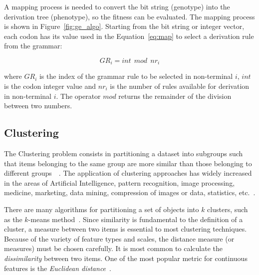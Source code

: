 \documentclass[conference,compsoc]{IEEEtran}
\begin{document}
A mapping process is needed to convert the bit string (genotype) into the derivation tree (phenotype), so the fitness can be evaluated. The mapping process is shown in Figure~\ref{fig:ge_algo}. Starting from the bit string or integer vector, each codon has its value used in the Equation~\ref{eq:map} to select a derivation rule from the grammar:


\begin{equation}\label{eq:map}
GR_i = int~~mod~~nr_i
\end{equation}


where $GR_i$ is the index of the grammar rule to be selected in non-terminal $i$, $int$ is the codon integer value and $nr_i$ is the number of rules available for derivation in non-terminal $i$. The operator $mod$ returns the remainder of the division between two numbers.


\subsection{Clustering}


The Clustering problem consists in partitioning a dataset into subgroups such that items belonging to the same group are more similar than those belonging to different groups~\cite{boric2007genetic}~\cite{ahalya2015data}. The application of clustering approaches has widely increased in the areas of Artificial Intelligence, pattern recognition, image processing, medicine, marketing, data mining, compression of images or data, statistics, etc.~\cite{ahalya2015data}.






There are many algorithms for partitioning a set of objects into $k$ clusters, such as the $k$-means method~\cite{kanungo2002efficient}. Since similarity is fundamental to the definition of a cluster, a measure between two items is essential to most clustering techniques. Because of the variety of feature types and scales, the distance measure (or measures) must be chosen carefully. It is most common to calculate the \textit{dissimilarity} between two items. One of the most popular metric for continuous features is the \textit{Euclidean distance}~\cite{jain1988algorithms}.
\end{document}
